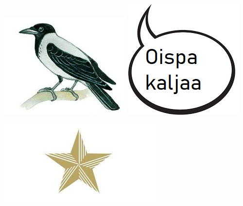 \documentclass[10pt, a4paper]{article}
\begin{document}
\begin{multicols}{2}
\begin{flushleft}



\columnbreak

\includegraphics[scale=0.64]{kuvat/varis-puussa.png}
\includegraphics[scale=1.1]{kuvat/oispa-kaljaa.png}
\vspace{1.5cm}

\vspace{0.5cm}

\pagebreak


\hspace*{-4cm}\includegraphics[scale=1.2]{kuvat/jallutahti.png}
\columnbreak





\columnbreak

\vspace{2cm}


\end{flushleft}
\end{multicols}
\end{document}
